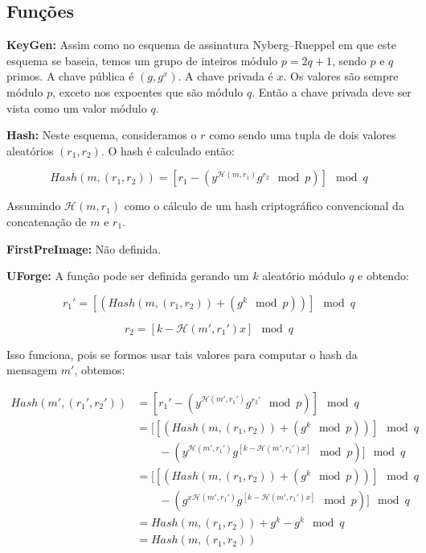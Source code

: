 \documentclass[a4paper]{article}
\begin{document}
\subsection{Funções}

\textbf{KeyGen: }Assim como no esquema de assinatura Nyberg–Rueppel em
que este esquema se baseia, temos um grupo de inteiros módulo
$p=2q+1$, sendo $p$ e $q$ primos. A chave pública é $(g, g^x)$. A
chave privada é $x$. Os valores são sempre módulo $p$, exceto nos
expoentes que são módulo $q$. Então a chave privada deve ser vista
como um valor módulo $q$.

\textbf{Hash: }Neste esquema, consideramos o $r$ como sendo uma tupla
de dois valores aleatórios $(r_1, r_2)$. O hash é calculado então:

$$
Hash(m, (r_1, r_2)) = \left[r_1-(y^{\mathcal{H}(m, r_1)}g^{r_2} \mod p)\right] \mod q
$$

Assumindo $\mathcal{H}(m, r_1)$ como o cálculo de um hash
criptográfico convencional da concatenação de $m$ e $r_1$.

\textbf{FirstPreImage:} Não definida.

\textbf{UForge:} A função pode ser definida gerando um $k$ aleatório
módulo $q$ e obtendo:

$$
r_1' = \left[(Hash(m, (r_1, r_2)) + (g^k \mod p))\right] \mod q
$$

$$
r_2 = \left[k-\mathcal{H}(m', r_1')x\right] \mod q
$$

Isso funciona, pois se formos usar tais valores para computar o hash
da mensagem $m'$, obtemos:

\begin{equation}
\begin{split}
  Hash(m', (r_1', r_2')) &= \left[r_1'-(y^{\mathcal{H}(m', r_1')}g^{r_2'} \mod p)\right] \mod q\\
  &=\big[\left[(Hash(m, (r_1, r_2)) + (g^k \mod p))\right] \mod q\\
    &\qquad-(y^{\mathcal{H}(m', r_1')}g^{[k-\mathcal{H}(m', r_1')x]} \mod p)\big] \mod q\\
  &=\big[\left[(Hash(m, (r_1, r_2)) + (g^k \mod p))\right] \mod q\\
    &\qquad-(g^{x\mathcal{H}(m', r_1')}g^{[k-\mathcal{H}(m', r_1')x]} \mod p)\big] \mod q\\
  &= Hash(m, (r_1, r_2)) + g^k - g^k \mod q\\
  &= Hash(m, (r_1, r_2))
\end{split}
\end{equation}
\end{document}
